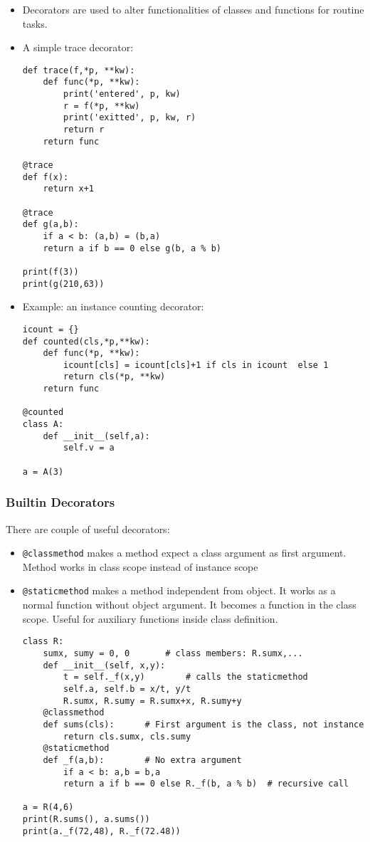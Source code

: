 \documentclass[trans,compress,xcolor=table]{beamer}
\begin{document}
\begin{frame}[fragile]
\begin{itemize}
\item Decorators are used to alter functionalities of classes and functions for routine tasks.
\item A simple trace decorator:
\begin{lstlisting}
def trace(f,*p, **kw):
	def func(*p, **kw):
		print('entered', p, kw)
		r = f(*p, **kw)
		print('exitted', p, kw, r)
		return r
	return func

@trace
def f(x):
	return x+1

@trace
def g(a,b):
	if a < b: (a,b) = (b,a)
	return a if b == 0 else g(b, a % b)

print(f(3))
print(g(210,63))
\end{lstlisting}
\end{itemize}
\end{frame}

\begin{frame}[fragile]
\begin{itemize}
\item Example: an instance counting decorator:
\begin{lstlisting}
icount = {}
def counted(cls,*p,**kw):
    def func(*p, **kw):
        icount[cls] = icount[cls]+1 if cls in icount  else 1
        return cls(*p, **kw)
    return func

@counted
class A:
    def __init__(self,a):
        self.v = a
        
a = A(3)
\end{lstlisting}
\end{itemize}
\end{frame}

\begin{frame}[fragile]
\frametitle{Builtin Decorators}
\scriptsize
There are couple of useful decorators:
\begin{itemize}
\item \lstinline{@classmethod} makes a method expect a class argument as first argument. Method works in class scope instead of instance scope
\item \lstinline{@staticmethod} makes a method independent from object. It works as a normal function without object argument. It becomes a function in the class scope. Useful for auxiliary functions inside class definition.
\begin{lstlisting}[basicstyle=\tiny\tt]
class R:
    sumx, sumy = 0, 0		# class members: R.sumx,...
    def __init__(self, x,y):
        t = self._f(x,y)		# calls the staticmethod
        self.a, self.b = x/t, y/t
        R.sumx, R.sumy = R.sumx+x, R.sumy+y
    @classmethod
    def sums(cls):		# First argument is the class, not instance
        return cls.sumx, cls.sumy
    @staticmethod
    def _f(a,b):		# No extra argument 
        if a < b: a,b = b,a
        return a if b == 0 else R._f(b, a % b)  # recursive call

a = R(4,6)
print(R.sums(), a.sums())
print(a._f(72,48), R._f(72.48))
\end{lstlisting}

\end{itemize}
\end{frame}
\end{document}
